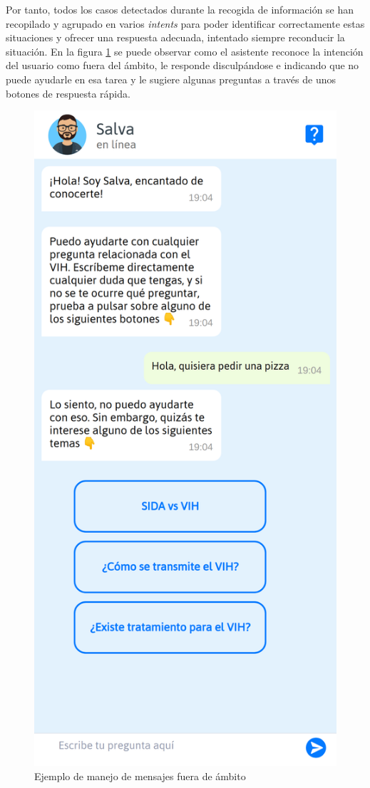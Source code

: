 Por tanto, todos los casos detectados durante la recogida de información se han recopilado y agrupado en varios \textit{intents} para poder identificar correctamente estas situaciones y ofrecer una respuesta adecuada, intentado siempre reconducir la situación. En la figura \ref{fig:out1} se puede observar como el asistente reconoce la intención del usuario como fuera del ámbito, le responde disculpándose e indicando que no puede ayudarle en esa tarea y le sugiere algunas preguntas a través de unos botones de respuesta rápida.\\

\begin{figure}[htbp]
\centering
\includegraphics[scale=0.15]{../images/out_of_scope.png}
\caption{Ejemplo de manejo de mensajes fuera de ámbito}
\label{fig:out1}
\end{figure}


